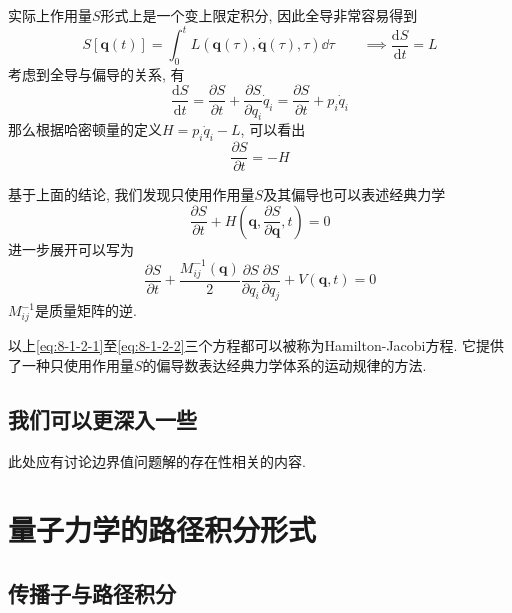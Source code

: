         实际上作用量$S$形式上是一个变上限定积分, 因此全导非常容易得到
        \begin{equation}
            S[\bm q(t)] = \int_{0}^{t} L( \bm q(\tau), \dot{\bm q}(\tau), \tau ) \dd \tau
            \qquad \implies \frac{\mathrm{d} S}{\mathrm{d} t} = L
        \end{equation}
        考虑到全导与偏导的关系, 有
        \begin{equation}
            \frac{\mathrm{d} S}{\mathrm{d} t} = \frac{\partial S}{\partial t} + \frac{\partial S}{\partial q_i} \dot{q}_i = \frac{\partial S}{\partial t} + p_i\dot{q}_i
        \end{equation}
        那么根据哈密顿量的定义$H = p_i \dot q_i - L$, 可以看出
        \begin{equation}\label{eq:8-1-2-1}
            \frac{\partial S}{\partial t} = - H
        \end{equation}

        基于上面的结论, 我们发现只使用作用量$S$及其偏导也可以表述经典力学
        \begin{equation}
            \frac{\partial S}{\partial t} + H(\bm q, \frac{\partial S}{\partial \bm q}, t) = 0
        \end{equation}
        进一步展开可以写为
        \begin{equation}\label{eq:8-1-2-2}
            \frac{\partial S}{\partial t} + \frac{M^{-1}_{ij}(\bm q)}{2} \frac{\partial S}{\partial q_i}\frac{\partial S}{\partial q_j} + V(\bm q, t) = 0
        \end{equation}
        $M^{-1}_{ij}$是质量矩阵的逆. 

        以上\ref{eq:8-1-2-1}至\ref{eq:8-1-2-2}三个方程都可以被称为Hamilton-Jacobi方程. 它提供了一种只使用作用量$S$的偏导数表达经典力学体系的运动规律的方法.

        \subsection{我们可以更深入一些}

        此处应有讨论边界值问题解的存在性相关的内容.

    \section{量子力学的路径积分形式}

        \subsection{传播子与路径积分}

